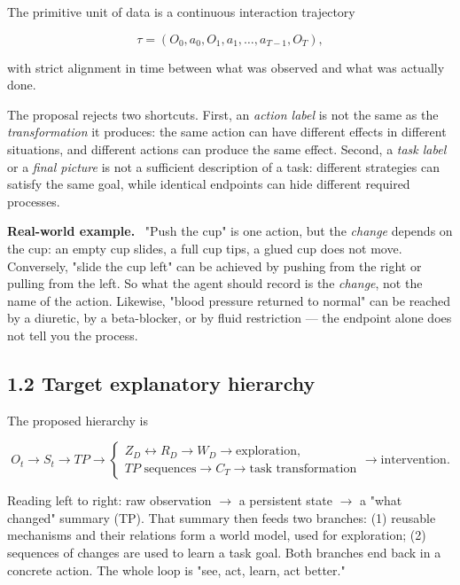 \documentclass[11pt]{article}
\newenvironment{plainword}{%
  \par\medskip\noindent\begin{minipage}{\textwidth}%
  \color{gray!75!black}\small\itshape
}{%
  \end{minipage}\par\medskip}
\newenvironment{example}{%
  \par\smallskip\noindent\begin{minipage}{\textwidth}%
  \color{teal!60!black}\small
  \textbf{\color{teal!70!black}Real-world example.}\
}{%
  \end{minipage}\par\smallskip}
\begin{document}
The primitive unit of data is a continuous interaction trajectory

\[
\boxed{\tau=(O_0,a_0,O_1,a_1,\ldots,a_{T-1},O_T),}
\]

with strict alignment in time between what was observed and what was actually done.

The proposal rejects two shortcuts. First, an \emph{action label} is not the same as the \emph{transformation} it produces: the
same action can have different effects in different situations, and different actions can produce the same effect. Second, a
\emph{task label} or a \emph{final picture} is not a sufficient description of a task: different strategies can satisfy the same
goal, while identical endpoints can hide different required processes.

\begin{example}
"Push the cup" is one action, but the \emph{change} depends on the cup: an empty cup slides, a full cup tips, a glued cup does
not move. Conversely, "slide the cup left" can be achieved by pushing from the right or pulling from the left. So what the agent
should record is the \emph{change}, not the name of the action. Likewise, "blood pressure returned to normal" can be reached by
a diuretic, by a beta-blocker, or by fluid restriction --- the endpoint alone does not tell you the process.
\end{example}

\subsection*{1.2 Target explanatory hierarchy}

The proposed hierarchy is

\[
\boxed{
O_t\rightarrow S_t\rightarrow TP\rightarrow
\left\{
\begin{array}{l}
Z_D\leftrightarrow R_D\rightarrow W_D\rightarrow \text{exploration},\\
TP\text{ sequences}\rightarrow C_T\rightarrow \text{task transformation}
\end{array}
\right.
\rightarrow \text{intervention}.}
\]

\begin{plainword}
Reading left to right: raw observation $\to$ a persistent state $\to$ a "what changed" summary (TP). That summary then feeds two
branches: (1) reusable mechanisms and their relations form a world model, used for exploration; (2) sequences of changes are used
to learn a task goal. Both branches end back in a concrete action. The whole loop is "see, act, learn, act better."
\end{plainword}
\end{document}
